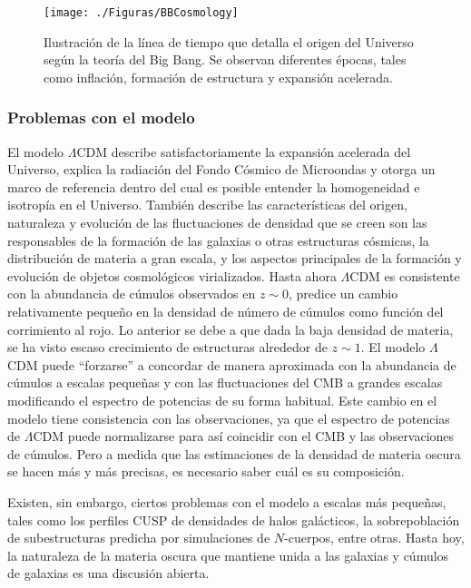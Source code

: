 \documentclass[a4paper,openright,12pt]{book}
\begin{document}
\begin{figure}
\centering
  \texttt{[image: ./Figuras/BBCosmology]}
  \caption{\footnotesize{Ilustración de la línea de tiempo que detalla el origen del Universo según la teoría del Big Bang. Se observan diferentes épocas, tales como inflación, formación de estructura y expansión acelerada.}}
  \label{fig 1.6}
\end{figure}



\subsubsection*{Problemas con el modelo}
El modelo $\Lambda$CDM describe satisfactoriamente la expansión acelerada del Universo, explica la radiación del Fondo Cósmico de Microondas y otorga un marco de referencia dentro del cual es posible entender la homogeneidad e isotropía en el Universo. También describe las características del origen, naturaleza y evolución de las fluctuaciones de densidad que se creen son las responsables de la formación de las galaxias o otras estructuras cósmicas, la distribución de materia a gran escala, y los aspectos principales de la formación y evolución de objetos cosmológicos virializados. Hasta ahora $\Lambda$CDM es consistente con la abundancia de cúmulos observados en $z \sim 0$, predice un cambio relativamente pequeño en la densidad de número de cúmulos como función del corrimiento al rojo. Lo anterior se debe a que dada la baja densidad de materia, se ha visto escaso crecimiento de estructuras alrededor de $z \sim 1$. El modelo $\Lambda$CDM puede ``forzarse'' a concordar de manera aproximada con la abundancia de cúmulos a escalas pequeñas y con las fluctuaciones del CMB a grandes escalas modificando el espectro de potencias de su forma habitual. Este cambio en el modelo tiene consistencia con las observaciones, ya que el espectro de potencias de $\Lambda$CDM puede normalizarse para así coincidir con el CMB y las observaciones de cúmulos. Pero a medida que las estimaciones de la densidad de materia oscura se hacen más y más precisas, es necesario saber cuál es su composición.

Existen, sin embargo, ciertos problemas con el modelo a escalas más pequeñas, tales como los perfiles CUSP de densidades de halos galácticos, la sobrepoblación de subestructuras predicha por simulaciones de $N$-cuerpos, entre otras. Hasta hoy, la naturaleza de la materia oscura que mantiene unida a las galaxias y cúmulos de galaxias es una discusión abierta.
\end{document}
